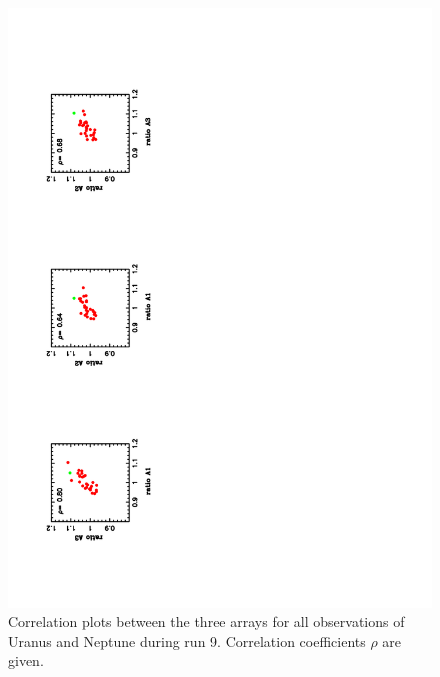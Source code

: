 \begin{figure}
  \includegraphics[clip, angle=-90, scale=0.65]{Figures/Ura_Nept_correlation_plots.pdf}
  \caption{Correlation plots between  the three arrays for all
    observations of Uranus and Neptune during run 9. Correlation
    coefficients $\rho$ are given.}
\label{fig:U_N_corr}
\end{figure}



